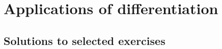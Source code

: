 \documentclass[../book/calcnotes.tex]{subfiles}
\begin{document}
\chapter{Applications of differentiation}
\label{sec:derivative-applications}

\section{Solutions to selected exercises}
\label{sec:derivative-applications.solns}
\printsolutions[chapter]
\end{document}

